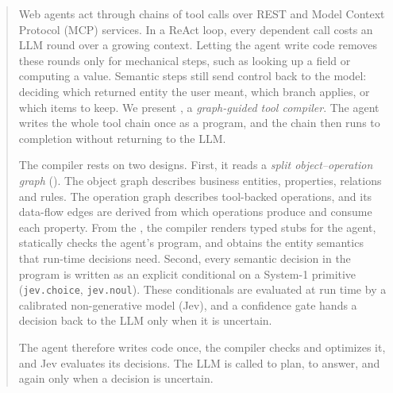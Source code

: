 \begin{abstract}
Web agents act through chains of tool calls over REST and Model Context Protocol (MCP) services. In a ReAct loop, every dependent call costs an LLM round over a growing context. Letting the agent write code removes these rounds only for mechanical steps, such as looking up a field or computing a value. Semantic steps still send control back to the model: deciding which returned entity the user meant, which branch applies, or which items to keep. We present \jif, a \emph{graph-guided tool compiler}. The agent writes the whole tool chain once as a program, and the chain then runs to completion without returning to the LLM.

The compiler rests on two designs. First, it reads a \emph{split object--operation graph} (\sog). The object graph describes business entities, properties, relations and rules. The operation graph describes tool-backed operations, and its data-flow edges are derived from which operations produce and consume each property. From the \sog, the compiler renders typed stubs for the agent, statically checks the agent's program, and obtains the entity semantics that run-time decisions need. Second, every semantic decision in the program is written as an explicit conditional on a System-1 primitive (\texttt{jev.choice}, \texttt{jev.noul}). These conditionals are evaluated at run time by a calibrated non-generative model (Jev), and a confidence gate hands a decision back to the LLM only when it is uncertain.

The agent therefore writes code once, the compiler checks and optimizes it, and Jev evaluates its decisions. The LLM is called to plan, to answer, and again only when a decision is uncertain. 
\end{abstract}
